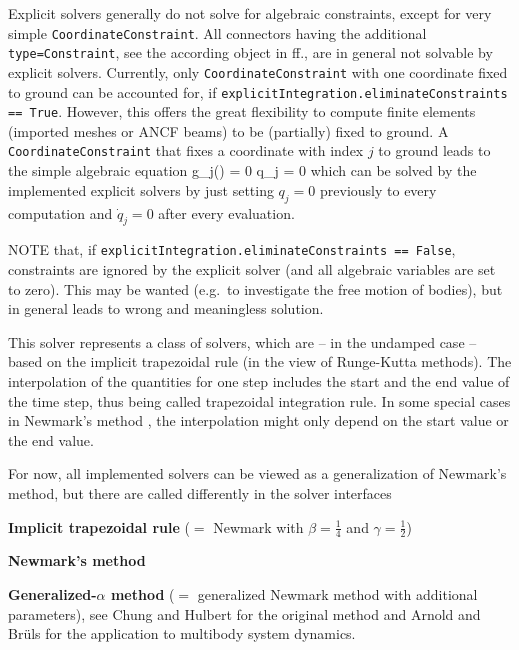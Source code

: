 Explicit solvers generally do not solve for algebraic constraints, except for very simple \texttt{CoordinateConstraint}. 
All connectors having the additional \texttt{type=Constraint}, see the according object in ff., 
are in general not solvable by explicit solvers. 
Currently, only \texttt{CoordinateConstraint} with one coordinate fixed to ground can be accounted for, 
if \texttt{explicitIntegration.eliminateConstraints == True}. 
However, this offers the great flexibility to compute finite elements (imported meshes or ANCF beams) to be (partially) fixed to ground.
A \texttt{CoordinateConstraint} that fixes a coordinate with index $j$ to ground leads to the simple algebraic  equation
\be
	g_j(\qv) = 0 \quad \Leftrightarrow \quad  q_j = 0
\ee
which can be solved by the implemented explicit solvers by just setting $q_j = 0$ previously to every computation and $\dot q_j = 0$ after every  evaluation.

NOTE that, if \texttt{explicitIntegration.eliminateConstraints == False}, constraints are ignored by the explicit solver (and all algebraic variables are set to zero). This may be wanted (e.g.\ to investigate the free motion of bodies), but in general leads to wrong and meaningless solution.

\label{sec:ImplicitTrapezoidalSolver}
This solver represents a class of solvers, which are -- in the undamped case -- based on the implicit trapezoidal rule (in the view of Runge-Kutta methods). The interpolation of the quantities for one step includes the start and the end value of the time step, thus being called trapezoidal integration rule. In some special cases in Newmark's method \cite{Newmark1959}, the interpolation might only depend on the start value or the end value.

For now, all implemented solvers can be viewed as a generalization of Newmark's method, but there are called differently in the solver interfaces
\bi
  \item {\bf Implicit trapezoidal rule} ($=$ Newmark with $\beta = \frac 1 4$ and $\gamma = \frac 1 2$) 
	\item {\bf Newmark's method} \cite{Newmark1959}
	\item {\bf Generalized-$\alpha$ method} ($=$ generalized Newmark method with additional parameters), see Chung and Hulbert \cite{Chung1993} for the original method and Arnold and Br\"uls \cite{Arnold2007} for the application to multibody system dynamics.
\ei

